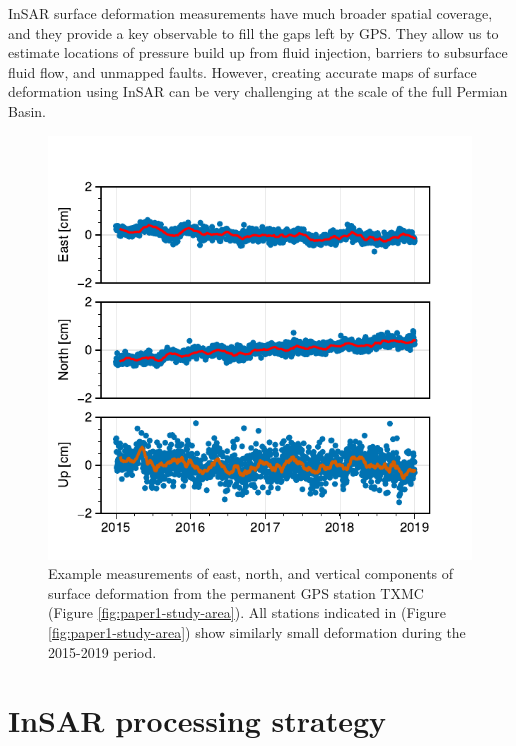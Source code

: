 InSAR surface deformation measurements have much broader spatial coverage, and they provide a key observable to fill the gaps left by GPS. They allow us to estimate locations of pressure build up from fluid injection, barriers to subsurface fluid flow, and unmapped faults. However, creating accurate maps of surface deformation using InSAR can be very challenging at the scale of the full Permian Basin.


\begin{figure}
	\centering
	\includegraphics[width=0.9\linewidth]{figures/chapter3-permian/gps-txmc.pdf}
	\caption[Example permanent GPS station measurements]{
		Example measurements of east, north, and vertical components of surface deformation from the permanent GPS station TXMC (Figure \ref{fig:paper1-study-area}). All stations indicated in (Figure \ref{fig:paper1-study-area}) show similarly small deformation during the 2015-2019 period.
	}
	\label{fig:ch3-gps}
\end{figure}


\section{InSAR processing strategy}
\label{sec:ch2-insar-processing}


